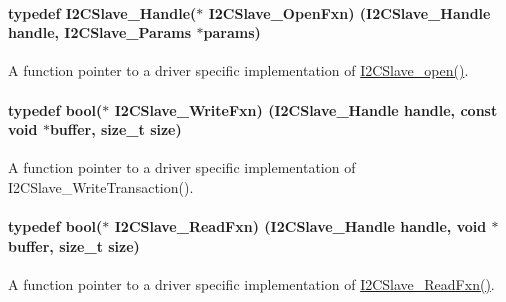 \paragraph[{I2\+C\+Slave\+\_\+\+Open\+Fxn}]{\setlength{\rightskip}{0pt plus 5cm}typedef {\bf I2\+C\+Slave\+\_\+\+Handle}($\ast$ I2\+C\+Slave\+\_\+\+Open\+Fxn) ({\bf I2\+C\+Slave\+\_\+\+Handle} handle, {\bf I2\+C\+Slave\+\_\+\+Params} $\ast$params)}\label{_i2_c_slave_8h_a7c6638bde6397024b1f1ece4f9baed37}


A function pointer to a driver specific implementation of \hyperlink{_i2_c_slave_8h_abdfc770ace6accbf91b91f3e195e7119}{I2\+C\+Slave\+\_\+open()}. 

\paragraph[{I2\+C\+Slave\+\_\+\+Write\+Fxn}]{\setlength{\rightskip}{0pt plus 5cm}typedef bool($\ast$ I2\+C\+Slave\+\_\+\+Write\+Fxn) ({\bf I2\+C\+Slave\+\_\+\+Handle} handle, const void $\ast$buffer, size\+\_\+t size)}\label{_i2_c_slave_8h_a7515207a9b0bde39ff2744ac3ed366ea}


A function pointer to a driver specific implementation of I2\+C\+Slave\+\_\+\+Write\+Transaction(). 

\paragraph[{I2\+C\+Slave\+\_\+\+Read\+Fxn}]{\setlength{\rightskip}{0pt plus 5cm}typedef bool($\ast$ I2\+C\+Slave\+\_\+\+Read\+Fxn) ({\bf I2\+C\+Slave\+\_\+\+Handle} handle, void $\ast$buffer, size\+\_\+t size)}\label{_i2_c_slave_8h_ac74d6f05afaf02a4238fe59a588cd787}


A function pointer to a driver specific implementation of \hyperlink{_i2_c_slave_8h_ac74d6f05afaf02a4238fe59a588cd787}{I2\+C\+Slave\+\_\+\+Read\+Fxn()}. 

